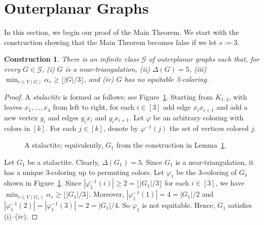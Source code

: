 \documentclass[11pt]{article}
\newtheorem{construct}[lem]{Construction}
\theoremstyle{definition}
\newcommand\floor[1]{\lfloor#1\rfloor}
\renewcommand\ge\geqslant
\newcommand{\stalactite}[3]{
\begin{scope}[yscale=.866]
\draw[thick] (#1,0) -- (#1+1,0) -- (#1+2,0) -- (#1+3,0) (#1,0) -- (#1+1.5,1) -- (#1+1,0) (#1+2,0) -- (#1+1.5,1) -- (#1+3,0) (#1,0) -- (#1
+0.5,-1) -- (#1+1,0) -- (#1+1.5,-1) -- (#1+2,0) -- (#1+2.5,-1) -- (#1+3,0);
\foreach \i/\j/\c in {#1+1.5/1/1, #1+0.5/-1/1, #1+1.5/-1/1, #1+2.5/-1/1, #1/0/#2, #1+2/0/#2, #1+1/0/#3, #1+3/0/#3}
\draw[thick] (\i,\j) node[ubStyle] {\tiny{\bf\c}};
\end{scope}
}
\begin{document}
\section{Outerplanar Graphs}
\label{outerplanar-sec}
In this section, we begin our proof of the Main Theorem.  We start with the construction showing that the Main Theorem becomes false if we let $s:=3$.

\begin{construct}
\label{s=3-lemma}
	There is an infinite class $\mathcal{G}$ of outerplanar graphs such that, for every $G\in\mathcal{G}$, (i) $G$ is a near-triangulation, (ii) $\Delta(G)=5$, (iii) $\min_{v\in V(G)}\alpha_v \ge \floor{|G|/3}$, and (iv) $G$ has no equitable 3-coloring.
\end{construct}

\begin{proof}

A \textit{stalactite} is formed as follows; see Figure~\ref{counterexample1}. Starting from $K_{1,4}$, with leaves $x_1,\dots,x_4$ from left to right, for each $i\in[3]$ add edge $x_ix_{i+1}$ and add a new vertex $y_i$ and edges $y_ix_i$ and $y_ix_{i+1}$. 
Let $\varphi$ be an arbitrary coloring with colors in $[k]$. For each $j\in[k]$, denote by $\varphi^{-1}(j)$ the set of vertices colored $j$.

\begin{figure}[!h]
\centering
{}
\caption{A stalactite; equivalently, $G_1$ from the construction in Lemma~\ref{s=3-lemma}.}
\label{counterexample1}
\end{figure}

	Let $G_1$ be a stalactite. Clearly, $\Delta(G_1)=5$. Since $G_1$ is a near-triangulation, it has a unique $3$-coloring up to permuting colors. 
	Let $\varphi_1$ be the $3$-coloring of $G_1$ shown in Figure~\ref{counterexample1}. Since $|\varphi_1^{-1}(i)|\ge2=\lfloor{|G_1|}/3\rfloor$ for each 
	$i\in[3]$, we have $\min_{v\in V(G_1)}\alpha_v\ge\floor{|G_1|/3}$. Moreover, 
	$|\varphi_1^{-1}(1)|=4={|G_1|}/{2}$ and $|\varphi_1^{-1}(2)|=|\varphi_1^{-1}(3)|=
	2={|G_1|}/{4}$. So $\varphi_1$ is not equitable. Hence, $G_1$ satisfies (i)--(iv).


\end{proof}
\end{document}
